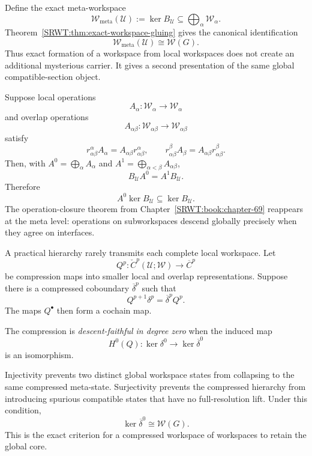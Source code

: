 
Define the exact meta-workspace
\[
\boxed{
\mathscr W_{\mathrm{meta}}(\mathcal U)
:=
\ker B_{\mathcal U}
\subseteq
\bigoplus_\alpha\mathscr W_\alpha.
}
\]
Theorem~\ref{SRWT:thm:exact-workspace-gluing} gives the canonical identification
\[
\boxed{
\mathscr W_{\mathrm{meta}}(\mathcal U)
\cong
\mathscr W(G).
}
\]
Thus exact formation of a workspace from local workspaces does not create an
additional mysterious carrier. It gives a second presentation of the same
global compatible-section object.

Suppose local operations
\[
A_\alpha:\mathscr W_\alpha\to\mathscr W_\alpha
\]
and overlap operations
\[
A_{\alpha\beta}:\mathscr W_{\alpha\beta}\to
\mathscr W_{\alpha\beta}
\]
satisfy
\[
r_{\alpha\beta}^{\alpha}A_\alpha
=
A_{\alpha\beta}r_{\alpha\beta}^{\alpha},
\qquad
r_{\alpha\beta}^{\beta}A_\beta
=
A_{\alpha\beta}r_{\alpha\beta}^{\beta}.
\]
Then, with \(A^0=\bigoplus_\alpha A_\alpha\) and
\(A^1=\bigoplus_{\alpha<\beta}A_{\alpha\beta}\),
\[
B_{\mathcal U}A^0=A^1B_{\mathcal U}.
\]
Therefore
\[
A^0\ker B_{\mathcal U}\subseteq\ker B_{\mathcal U}.
\]
The operation-closure theorem from Chapter~\ref{SRWT:book:chapter-69} reappears at the meta level:
operations on subworkspaces descend globally precisely when they agree on
interfaces.


A practical hierarchy rarely transmits each complete local workspace. Let
\[
Q^p:\check C^p(\mathcal U;\mathscr W)\to\overline C^p
\]
be compression maps into smaller local and overlap representations. Suppose
there is a compressed coboundary \(\overline\delta^p\) such that
\[
\boxed{
Q^{p+1}\delta^p
=
\overline\delta^p Q^p.
}
\]
The maps \(Q^\bullet\) then form a cochain map.

\begin{SRWTdefinition}\label{SRWT:def:descent-faithful}
The compression is \emph{descent-faithful in degree zero} when the induced map
\[
\boxed{
H^0(Q):
\ker\delta^0
\longrightarrow
\ker\overline\delta^0
}
\]
is an isomorphism.
\end{SRWTdefinition}

Injectivity prevents two distinct global workspace states from collapsing to
the same compressed meta-state. Surjectivity prevents the compressed hierarchy
from introducing spurious compatible states that have no full-resolution
lift. Under this condition,
\[
\boxed{
\ker\overline\delta^0
\cong
\mathscr W(G).
}
\]
This is the exact criterion for a compressed workspace of workspaces to retain
the global core.

